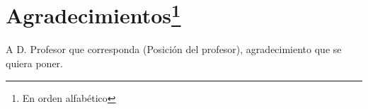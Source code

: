 %
%

\chapter*{Agradecimientos\footnote{En orden alfabético}}

A D. Profesor que corresponda (Posición del profesor), agradecimiento que se quiera poner.
